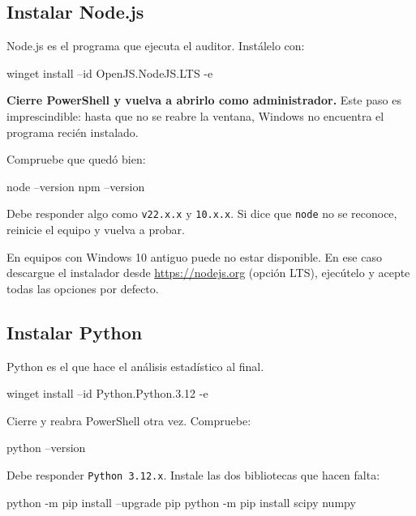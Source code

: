 \documentclass[11pt,a4paper]{article}
\begin{document}
\subsection{Instalar Node.js}

Node.js es el programa que ejecuta el auditor. Instálelo con:

\begin{orden}
winget install --id OpenJS.NodeJS.LTS -e
\end{orden}

\textbf{Cierre PowerShell y vuelva a abrirlo como administrador.} Este paso es imprescindible: hasta que no se reabre la ventana, Windows no encuentra el programa recién instalado.

Compruebe que quedó bien:

\begin{orden}
node --version
npm --version
\end{orden}

Debe responder algo como \texttt{v22.x.x} y \texttt{10.x.x}. Si dice que \texttt{node} no se reconoce, reinicie el equipo y vuelva a probar.

\begin{nota}
	En equipos con Windows 10 antiguo puede no estar disponible. En ese caso descargue el instalador desde \url{https://nodejs.org} (opción \textsf{LTS}), ejecútelo y acepte todas las opciones por defecto.
\end{nota}

\subsection{Instalar Python}

Python es el que hace el análisis estadístico al final.

\begin{orden}
winget install --id Python.Python.3.12 -e
\end{orden}

Cierre y reabra PowerShell otra vez. Compruebe:

\begin{orden}
python --version
\end{orden}

Debe responder \texttt{Python 3.12.x}. Instale las dos bibliotecas que hacen falta:

\begin{orden}
python -m pip install --upgrade pip
python -m pip install scipy numpy
\end{orden}
\end{document}
